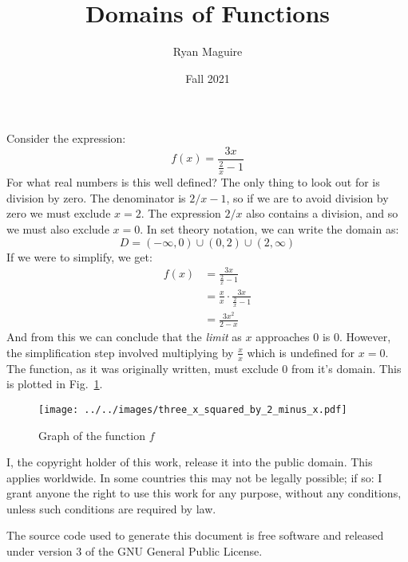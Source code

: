 \documentclass{article}
\title{Domains of Functions}
\author{Ryan Maguire}
\date{Fall 2021}
\begin{document}
    \maketitle
    Consider the expression:
    \begin{equation}
        f(x)=\frac{3x}{\frac{2}{x}-1}
    \end{equation}
    For what real numbers is this well defined? The only thing to look out for
    is division by zero. The denominator is $2/x-1$, so if we are to avoid
    division by zero we must exclude $x=2$. The expression $2/x$ also
    contains a division, and so we must also exclude $x=0$. In set theory
    notation, we can write the domain as:
    \begin{equation}
        D=(-\infty,0)\cup(0,2)\cup(2,\infty)
    \end{equation}
    If we were to simplify, we get:
    \begin{align}
        f(x)&=\frac{3x}{\frac{2}{x}-1}\\
            &=\frac{x}{x}\cdot\frac{3x}{\frac{2}{x}-1}\\
            &=\frac{3x^{2}}{2-x}
    \end{align}
    And from this we can conclude that the \textit{limit} as $x$ approaches
    0 is 0. However, the simplification step involved multiplying by
    $\frac{x}{x}$ which is undefined for $x=0$. The function, as it was
    originally written, must exclude 0 from it's domain. This is
    plotted in Fig.~\ref{fig:graph_of_func}.
    \begin{figure}
        \centering
        \texttt{[image: ../../images/three\_x\_squared\_by\_2\_minus\_x.pdf]}
        \caption{Graph of the function $f$}
        \label{fig:graph_of_func}
    \end{figure}
    \newpage
    I, the copyright holder of this work, release it into the public domain.
    This applies worldwide. In some countries this may not be legally possible;
    if so: I grant anyone the right to use this work for any purpose, without
    any conditions, unless such conditions are required by law.
    \par\hfill\par
    The source code used to generate this document is free software and released
    under version 3 of the GNU General Public License.
\end{document}
